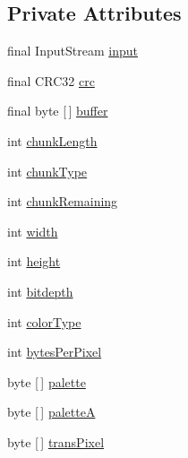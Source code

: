 \subsection*{Private Attributes}
\begin{DoxyCompactItemize}
\item 
final Input\+Stream \mbox{\hyperlink{classorg_1_1newdawn_1_1slick_1_1opengl_1_1_p_n_g_decoder_a5714583b8e4e668d86f45065cda6e20b}{input}}
\item 
final C\+R\+C32 \mbox{\hyperlink{classorg_1_1newdawn_1_1slick_1_1opengl_1_1_p_n_g_decoder_acd77b774496f8b2d08303022c6227ff1}{crc}}
\item 
final byte \mbox{[}$\,$\mbox{]} \mbox{\hyperlink{classorg_1_1newdawn_1_1slick_1_1opengl_1_1_p_n_g_decoder_ae205f9222586a2bc01a8a240c5c210ad}{buffer}}
\item 
int \mbox{\hyperlink{classorg_1_1newdawn_1_1slick_1_1opengl_1_1_p_n_g_decoder_aeb23de3eba5a6505ee1dd16094f78d7b}{chunk\+Length}}
\item 
int \mbox{\hyperlink{classorg_1_1newdawn_1_1slick_1_1opengl_1_1_p_n_g_decoder_a7d32000e77c9c28ad7751acf96da46ec}{chunk\+Type}}
\item 
int \mbox{\hyperlink{classorg_1_1newdawn_1_1slick_1_1opengl_1_1_p_n_g_decoder_a7304a0a75ad5821c3f8241a829705b42}{chunk\+Remaining}}
\item 
int \mbox{\hyperlink{classorg_1_1newdawn_1_1slick_1_1opengl_1_1_p_n_g_decoder_ab0fa613df8a9dadfcc722e8f038f3bc1}{width}}
\item 
int \mbox{\hyperlink{classorg_1_1newdawn_1_1slick_1_1opengl_1_1_p_n_g_decoder_a35019c52c6ce77631e6659743577854b}{height}}
\item 
int \mbox{\hyperlink{classorg_1_1newdawn_1_1slick_1_1opengl_1_1_p_n_g_decoder_a9fb5dab97411b31b55f38a801fe28d20}{bitdepth}}
\item 
int \mbox{\hyperlink{classorg_1_1newdawn_1_1slick_1_1opengl_1_1_p_n_g_decoder_a01a4bfaf3046e4b6eb944e7d48eb31c3}{color\+Type}}
\item 
int \mbox{\hyperlink{classorg_1_1newdawn_1_1slick_1_1opengl_1_1_p_n_g_decoder_aa7dcf351689be9279548b306395ee1a8}{bytes\+Per\+Pixel}}
\item 
byte \mbox{[}$\,$\mbox{]} \mbox{\hyperlink{classorg_1_1newdawn_1_1slick_1_1opengl_1_1_p_n_g_decoder_ad65d46461f9f8df68a6b5551d56d8479}{palette}}
\item 
byte \mbox{[}$\,$\mbox{]} \mbox{\hyperlink{classorg_1_1newdawn_1_1slick_1_1opengl_1_1_p_n_g_decoder_a273b1728dfd1158eb001f98fd4255a58}{paletteA}}
\item 
byte \mbox{[}$\,$\mbox{]} \mbox{\hyperlink{classorg_1_1newdawn_1_1slick_1_1opengl_1_1_p_n_g_decoder_ad3c546cf013c0c8bdee84a07fdc08389}{trans\+Pixel}}
\end{DoxyCompactItemize}

